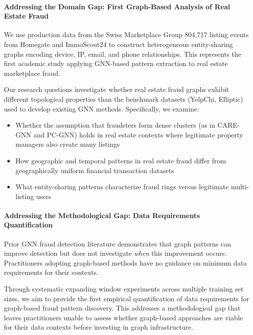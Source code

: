 \paragraph{Addressing the Domain Gap: First Graph-Based Analysis of Real Estate Fraud}

We use production data from the Swiss Marketplace Group 804,717 listing events from Homegate and ImmoScout24 to construct heterogeneous entity-sharing graphs encoding device, IP, email, and phone relationships. This represents the first academic study applying GNN-based pattern extraction to real estate marketplace fraud.

Our research questions investigate whether real estate fraud graphs exhibit different topological properties than the benchmark datasets (YelpChi, Elliptic) used to develop existing GNN methods. Specifically, we examine:

\begin{itemize}
    \item Whether the assumption that fraudsters form dense clusters (as in CARE-GNN and PC-GNN) holds in real estate contexts where legitimate property managers also create many listings
    \item How geographic and temporal patterns in real estate fraud differ from geographically uniform financial transaction datasets
    \item What entity-sharing patterns characterize fraud rings versus legitimate multi-listing users
\end{itemize}

\paragraph{Addressing the Methodological Gap: Data Requirements Quantification}

Prior GNN fraud detection literature demonstrates that graph patterns can improve detection but does not investigate \emph{when} this improvement occurs. Practitioners adopting graph-based methods have no guidance on minimum data requirements for their contexts.

Through systematic expanding window experiments across multiple training set sizes, we aim to provide the first empirical quantification of data requirements for graph-based fraud pattern discovery. This addresses a methodological gap that leaves practitioners unable to assess whether graph-based approaches are viable for their data contexts before investing in graph infrastructure.

